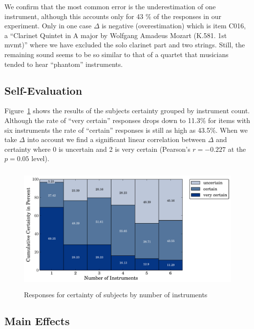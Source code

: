 We confirm \cite{huron89} that the most common error is the underestimation of one instrument, although this accounts only for 43 \% of the responses in our experiment. Only in one case $\Delta$ is negative (overestimation) which is item C016, a ``Clarinet Quintet in A major by Wolfgang Amadeus Mozart (K.581. 1st mvmt)'' where we have excluded the solo clarinet part and two strings. Still, the remaining sound seems to be so similar to that of a quartet that musicians tended to hear ``phantom'' instruments.
\vspace{-1.0em}

\subsection{Self-Evaluation}

Figure~\ref{fig:certainty} shows the results of the subjects certainty grouped by instrument count. Although the rate of ``very certain'' responses drops down to 11.3\% for items with six instruments the rate of ``certain'' responses is still as high as 43.5\%. When we take $\Delta$ into account we find a significant linear correlation between $\Delta$ and certainty where 0 is uncertain and 2 is very certain (Pearson's $r = -0.227$ at the $p=0.05$ level).

\begin{figure}[h]
	\centering
		\includegraphics[height=2.5in]{Chapters/ica/images/certainty.pdf}
	\caption{Responses for certainty of subjects by number of instruments}
	\label{fig:certainty}
\end{figure}

\subsection{Main Effects}

